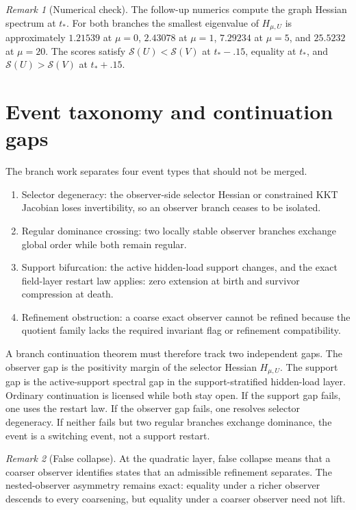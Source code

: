 \documentclass[11pt,a4paper]{article}
\numberwithin{equation}{section}
\theoremstyle{thmcompact}
\theoremstyle{remark}
\newtheorem*{remarkplain}{Remark}
\newenvironment{remark}[1][]%
{\begin{remarkbox}\begin{remarkplain}[#1]\normalfont}
{\end{remarkplain}\end{remarkbox}}
\begin{document}
\begin{remark}[Numerical check]
The follow-up numerics compute the graph Hessian spectrum at $t_*$. For both branches the smallest eigenvalue of $H_{\mu,U}$ is approximately $1.21539$ at $\mu=0$, $2.43078$ at $\mu=1$, $7.29234$ at $\mu=5$, and $25.5232$ at $\mu=20$. The scores satisfy $\mathcal S(U)<\mathcal S(V)$ at $t_*-.15$, equality at $t_*$, and $\mathcal S(U)>\mathcal S(V)$ at $t_*+.15$.
\end{remark}

\section{Event taxonomy and continuation gaps}

The branch work separates four event types that should not be merged.

\begin{enumerate}
\item Selector degeneracy: the observer-side selector Hessian or constrained KKT Jacobian loses invertibility, so an observer branch ceases to be isolated.
\item Regular dominance crossing: two locally stable observer branches exchange global order while both remain regular.
\item Support bifurcation: the active hidden-load support changes, and the exact field-layer restart law applies: zero extension at birth and survivor compression at death.
\item Refinement obstruction: a coarse exact observer cannot be refined because the quotient family lacks the required invariant flag or refinement compatibility.
\end{enumerate}

A branch continuation theorem must therefore track two independent gaps. The observer gap is the positivity margin of the selector Hessian $H_{\mu,U}$. The support gap is the active-support spectral gap in the support-stratified hidden-load layer. Ordinary continuation is licensed while both stay open. If the support gap fails, one uses the restart law. If the observer gap fails, one resolves selector degeneracy. If neither fails but two regular branches exchange dominance, the event is a switching event, not a support restart.

\begin{remark}[False collapse]
At the quadratic layer, false collapse means that a coarser observer identifies states that an admissible refinement separates. The nested-observer asymmetry remains exact: equality under a richer observer descends to every coarsening, but equality under a coarser observer need not lift.
\end{remark}
\end{document}
